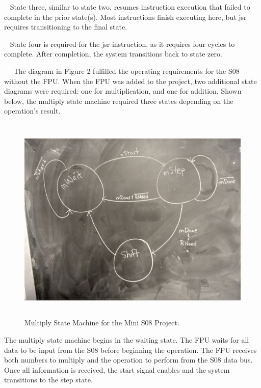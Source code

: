\documentclass[letterpaper, 12pt]{article}
\begin{document}
\begin{flushleft}
~\newline
State three, similar to state two, resumes instruction execution that failed to complete in the prior state(s).  Most instructions finish executing here, but jsr requires transitioning to the final state.

~\newline
State four is required for the jsr instruction, as it requires four cycles to complete.  After completion, the system transitions back to state zero.

~\newline ~\newline
The diagram in Figure 2 fulfilled the operating requirements for the S08 without the FPU.  When the FPU was added to the project, two additional state diagrams were required: one for multiplication, and one for addition.  Shown below, the multiply state machine required three states depending on the operation's result.

 \begin{figure}[H]
 	\centering
	\includegraphics[width=\linewidth,height=10cm,keepaspectratio]{multiply_states.jpg}
	\caption[Mini S08 Multiply State Machine Diagram]{Multiply State Machine for the Mini S08 Project.}
	\label{fig:arch}
\end{figure}

The multiply state machine begins in the waiting state.  The FPU waits for all data to be input from the S08 before beginning the operation.  The FPU receives both numbers to multiply and the operation to perform from the S08 data bus.  Once all information is received, the start signal enables and the system transitions to the step state.


\end{flushleft}
\end{document}
